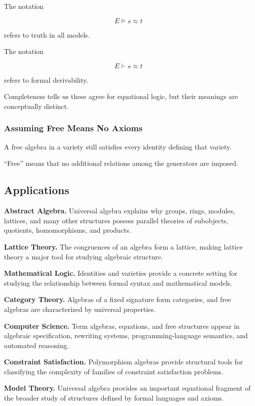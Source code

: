 The notation

\[ E\models s\approx t \]

refers to truth in all models.

The notation

\[ E\vdash s\approx t \]

refers to formal derivability.

Completeness tells us these agree for equational logic, but their meanings
are conceptually distinct.

\subsubsection{Assuming Free Means No Axioms}

A free algebra in a variety still satisfies every identity defining that
variety.

``Free'' means that no additional relations among the generators are
imposed.

\subsection{Applications}
\label{subsec:universal-algebra-applications}

\begin{applicationbox}
\textbf{Abstract Algebra.}
Universal algebra explains why groups, rings, modules, lattices, and many
other structures possess parallel theories of subobjects, quotients,
homomorphisms, and products.

\medskip

\textbf{Lattice Theory.}
The congruences of an algebra form a lattice, making lattice theory a major
tool for studying algebraic structure.

\medskip

\textbf{Mathematical Logic.}
Identities and varieties provide a concrete setting for studying the
relationship between formal syntax and mathematical models.

\medskip

\textbf{Category Theory.}
Algebras of a fixed signature form categories, and free algebras are
characterized by universal properties.

\medskip

\textbf{Computer Science.}
Term algebras, equations, and free structures appear in algebraic
specification, rewriting systems, programming-language semantics, and
automated reasoning.

\medskip

\textbf{Constraint Satisfaction.}
Polymorphism algebras provide structural tools for classifying the
complexity of families of constraint satisfaction problems.

\medskip

\textbf{Model Theory.}
Universal algebra provides an important equational fragment of the broader
study of structures defined by formal languages and axioms.
\end{applicationbox}

